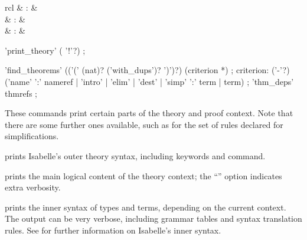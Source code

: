 \begin{isabellebody}
\begin{isamarkuptext}
\begin{matharray}{rcl}
    \hypertarget{command.thm-deps}{\hyperlink{command.thm-deps}{\mbox{}}}\isa{{\isachardoublequote}\isactrlsup {\isacharasterisk}{\isachardoublequote}} & : &  \\
    \hypertarget{command.print-facts}{\hyperlink{command.print-facts}{\mbox{}}}\isa{{\isachardoublequote}\isactrlsup {\isacharasterisk}{\isachardoublequote}} & : &  \\
    \hypertarget{command.print-binds}{\hyperlink{command.print-binds}{\mbox{}}}\isa{{\isachardoublequote}\isactrlsup {\isacharasterisk}{\isachardoublequote}} & : &  \\
  \end{matharray}

  \begin{rail}
    'print\_theory' ( '!'?)
    ;

    'find\_theorems' (('(' (nat)? ('with\_dups')? ')')?) (criterion *)
    ;
    criterion: ('-'?) ('name' ':' nameref | 'intro' | 'elim' | 'dest' |
      'simp' ':' term | term)
    ;
    'thm\_deps' thmrefs
    ;
  \end{rail}

  These commands print certain parts of the theory and proof context.
  Note that there are some further ones available, such as for the set
  of rules declared for simplifications.

  \begin{descr}
  
  \item [\hyperlink{command.print-commands}{\mbox{\isa{\isacommand{print{\isacharunderscore}commands}}}}] prints Isabelle's outer theory
  syntax, including keywords and command.
  
  \item [\hyperlink{command.print-theory}{\mbox{\isa{\isacommand{print{\isacharunderscore}theory}}}}] prints the main logical content of
  the theory context; the ``\isa{{\isachardoublequote}{\isacharbang}{\isachardoublequote}}'' option indicates extra
  verbosity.

  \item [\hyperlink{command.print-syntax}{\mbox{\isa{\isacommand{print{\isacharunderscore}syntax}}}}] prints the inner syntax of types
  and terms, depending on the current context.  The output can be very
  verbose, including grammar tables and syntax translation rules.  See
  \cite[\S7, \S8]{isabelle-ref} for further information on Isabelle's
  inner syntax.
  

\end{descr}
\end{isamarkuptext}
\end{isabellebody}
